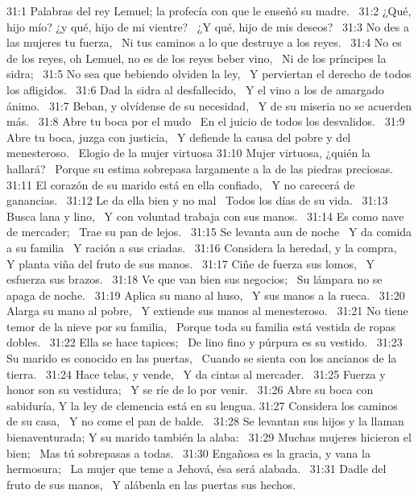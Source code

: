 31:1 Palabras del rey Lemuel; la profecía con que le enseñó su madre.  
31:2 ¿Qué, hijo mío? ¿y qué, hijo de mi vientre?  
¿Y qué, hijo de mis deseos?  
31:3 No des a las mujeres tu fuerza,  
Ni tus caminos a lo que destruye a los reyes.  
31:4 No es de los reyes, oh Lemuel, no es de los reyes beber vino,  
Ni de los príncipes la sidra;  
31:5 No sea que bebiendo olviden la ley,  
Y perviertan el derecho de todos los afligidos.  
31:6 Dad la sidra al desfallecido,  
Y el vino a los de amargado ánimo.  
31:7 Beban, y olvídense de su necesidad,  
Y de su miseria no se acuerden más.  
31:8 Abre tu boca por el mudo  
En el juicio de todos los desvalidos.  
31:9 Abre tu boca, juzga con justicia,  
Y defiende la causa del pobre y del menesteroso.  
Elogio de la mujer virtuosa 
31:10 Mujer virtuosa, ¿quién la hallará?  
Porque su estima sobrepasa largamente a la de las piedras preciosas.  
31:11 El corazón de su marido está en ella confiado,  
Y no carecerá de ganancias.  
31:12 Le da ella bien y no mal  
Todos los días de su vida.  
31:13 Busca lana y lino,  
Y con voluntad trabaja con sus manos.  
31:14 Es como nave de mercader;  
Trae su pan de lejos.  
31:15 Se levanta aun de noche  
Y da comida a su familia  
Y ración a sus criadas.  
31:16 Considera la heredad, y la compra,  
Y planta viña del fruto de sus manos.  
31:17 Ciñe de fuerza sus lomos,  
Y esfuerza sus brazos.  
31:18 Ve que van bien sus negocios;  
Su lámpara no se apaga de noche.  
31:19 Aplica su mano al huso,  
Y sus manos a la rueca.  
31:20 Alarga su mano al pobre,  
Y extiende sus manos al menesteroso.  
31:21 No tiene temor de la nieve por su familia,  
Porque toda su familia está vestida de ropas dobles.  
31:22 Ella se hace tapices;  
De lino fino y púrpura es su vestido.  
31:23 Su marido es conocido en las puertas,  
Cuando se sienta con los ancianos de la tierra.  
31:24 Hace telas, y vende,  
Y da cintas al mercader.  
31:25 Fuerza y honor son su vestidura;  
Y se ríe de lo por venir.  
31:26 Abre su boca con sabiduría, 
Y la ley de clemencia está en su lengua. 
31:27 Considera los caminos de su casa,  
Y no come el pan de balde.  
31:28 Se levantan sus hijos y la llaman bienaventurada; 
Y su marido también la alaba:  
31:29 Muchas mujeres hicieron el bien;  
Mas tú sobrepasas a todas.  
31:30 Engañosa es la gracia, y vana la hermosura;  
La mujer que teme a Jehová, ésa será alabada.  
31:31 Dadle del fruto de sus manos,  
Y alábenla en las puertas sus hechos.
